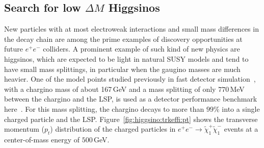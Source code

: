 \subsection{Search for low \texorpdfstring{$\Delta M$}{DeltaM} Higgsinos}
\label{subsec:bench:higgsino}

New particles with at most electroweak interactions and small mass differences in the decay chain are among the prime examples of discovery opportunities at future $e^+e^-$ colliders. A prominent example of such kind of
new physics are higgsinos, which are expected to be light in natural SUSY models and tend to have small mass
splittings, in particular when the gaugino masses are much heavier. One of the model points studied previously in fast detector simulation~\cite{Berggren:2013vfa}, with a chargino mass of about 167\,GeV and a mass splitting of only $770$\,MeV between the chargino and the LSP, is used as a detector performance benchmark here~\cite{ILDNote:higgsinos}. For this mass splitting, the chargino decays to more than $99\%$ into a single charged particle and the LSP. Figure~\ref{fig:higgsino:trkeffi:pt} shows the transverse momentum ($p_t$) distribution of the charged particles in $e^+e^- \to \tilde{\chi}^+_1 \tilde{\chi}^-_1$ events at a center-of-mass energy of $500$\,GeV.

